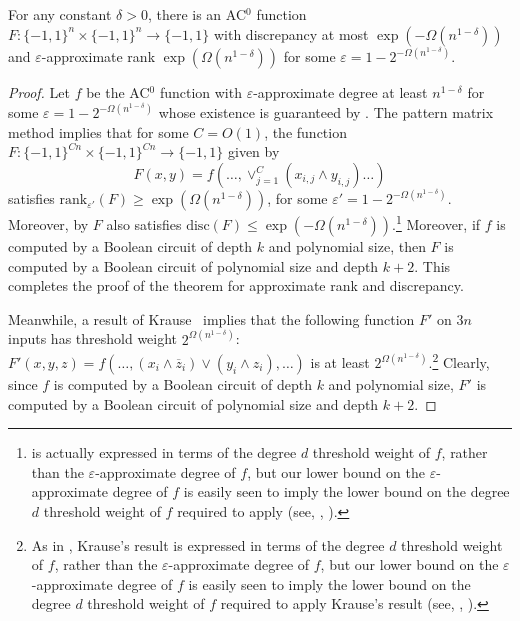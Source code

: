 \documentclass{toc}
\newcommand{\bits}{\{-1,1\}}
\newcommand{\eps}{\varepsilon}
\begin{document}
\begin{theorem} \label{thm:diediedie}
	For any constant $\delta > 0$, there is an AC$^0$ function $F \colon \bits^n \times \bits^n \to \bits$ with discrepancy at most $\exp(-\Omega(n^{1-\delta}))$
	and $\eps$-approximate rank $\exp(\Omega(n^{1-\delta}))$ for some $\eps = 1-2^{-\Omega(n^{1-\delta})}$. 
\end{theorem}
\begin{proof}
	Let $f$ be the AC$^0$ function with $\eps$-approximate degree at least $n^{1-\delta}$ for some $\eps=1-2^{-\Omega(n^{1-\delta})}$ whose existence is guaranteed
	by . The pattern matrix method \cite[Theorem 8.1]{patmat} implies that for some $C=O(1)$,
	the function 
	$F \colon \bits^{Cn}\times \bits^{Cn} \to \bits$ given by
	$$F(x, y) = f\left(\dots, \vee_{j=1}^C \left(x_{i, j} \wedge y_{i, j}\right) \dots\right)$$
	satisfies
	$\text{rank}_{\eps'}(F) \geq \exp(\Omega(n^{1-\delta}))$,
	for some $\eps'=1-2^{-\Omega(n^{1-\delta})}$.  
	Moreover, by \cite[Theorem 7.3]{patmat} $F$ also satisfies $\mathrm{disc}(F) \leq \exp(-\Omega(n^{1-\delta}))$.\footnote{\label{foot}\cite[Theorem 7.3]{patmat}
		is actually expressed in terms of the degree $d$ threshold weight of $f$, rather than the $\eps$-approximate degree of $f$,
		but our lower bound on the $\eps$-approximate degree of $f$ is easily seen to imply the lower bound on the degree $d$ threshold weight of $f$
required to apply  \cite[Theorem 7.3]{patmat} (see, \eg, \cite[Lemma 20]{bt14}).} 
	Moreover, if $f$ is computed by a Boolean circuit of depth $k$ and polynomial size,
	then $F$ is computed by a Boolean circuit of polynomial size and depth $k+2$. 
	This completes the proof of the theorem for approximate rank and discrepancy.
	
	Meanwhile, a result of Krause~\cite{krause} implies that the following
	function $F'$ on $3n$ inputs has threshold weight $2^{\Omega(n^{1-\delta})}$: 
	$F'(x, y, z)= f(\dots, (x_i \wedge \overline{z}_i )\vee  (y_i \wedge z_i), \dots )$ is at least $2^{\Omega(n^{1-\delta})}$.\footnote{As
		in , Krause's result is expressed in terms of the degree $d$ 
		threshold weight of $f$, rather than the $\eps$-approximate degree of $f$,
		but our lower bound on the $\eps$-approximate degree of $f$ is easily seen to imply the lower bound on the degree $d$ threshold weight of $f$
		required to apply Krause's result (see, \eg, \cite[Lemma 20]{bt14}).}
	Clearly, since $f$ is computed by a Boolean circuit of depth $k$ and polynomial size,
	$F'$ is computed by a Boolean circuit of polynomial size and depth $k+2$. 
\end{proof}
\end{document}
